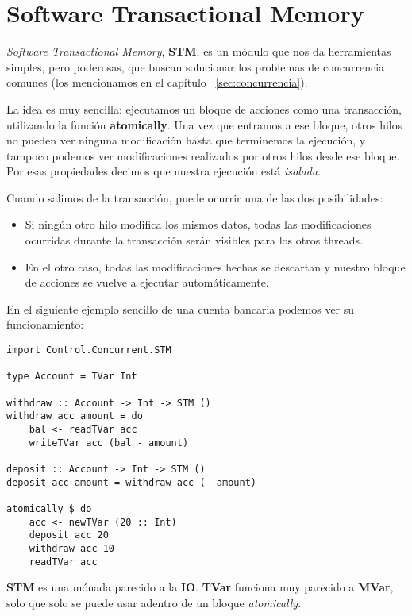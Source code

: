
\section{Software Transactional Memory} %
\label{sec:software_transactional_memory}

\textit{Software Transactional Memory}, \textbf{STM}, es un módulo que nos da herramientas simples, pero poderosas, que buscan solucionar los problemas de concurrencia comunes (los mencionamos en el capítulo ~\ref{sec:concurrencia}).

La idea es muy sencilla: ejecutamos un bloque de acciones como una transacción, utilizando la función \textbf{atomically}. Una vez que entramos a ese bloque, otros hilos no pueden ver ninguna modificación hasta que terminemos la ejecución, y tampoco podemos ver modificaciones realizados por otros hilos desde ese bloque. Por esas propiedades decimos que nuestra ejecución está \textit{isolada}.

Cuando salimos de la transacción, puede ocurrir una de las dos posibilidades:

\begin{itemize}
    \item Si ningún otro hilo modifica los mismos datos, todas las modificaciones ocurridas durante la transacción serán visibles para los otros threads.
    \item En el otro caso, todas las modificaciones hechas se descartan y nuestro bloque de acciones se vuelve a ejecutar automáticamente.
\end{itemize}

En el siguiente ejemplo sencillo de una cuenta bancaria podemos ver su funcionamiento:

\begin{lstlisting}
import Control.Concurrent.STM

type Account = TVar Int

withdraw :: Account -> Int -> STM ()
withdraw acc amount = do
    bal <- readTVar acc
    writeTVar acc (bal - amount)

deposit :: Account -> Int -> STM ()
deposit acc amount = withdraw acc (- amount)

atomically $ do
    acc <- newTVar (20 :: Int)
    deposit acc 20
    withdraw acc 10
    readTVar acc
\end{lstlisting}


\textbf{STM} es una mónada parecido a la \textbf{IO}. \textbf{TVar} funciona muy parecido a \textbf{MVar}, solo que solo se puede usar adentro de un bloque \textit{atomically}.


